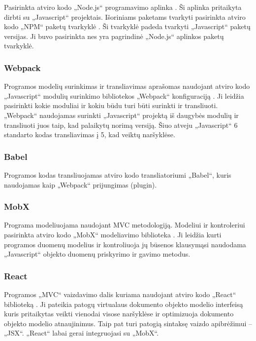 Pasirinkta atviro kodo „Node.js“ programavimo aplinka \cite{nodeJs}. Ši aplinka pritaikyta dirbti su „Javascript“ projektais. Išoriniams paketams tvarkyti pasirinkta atviro kodo „NPM“ paketų tvarkyklė \cite{npmWebsite}. Ši tvarkyklė padeda tvarkyti „Javascript“ paketų versijas. Ji buvo pasirinkta nes yra pagrindinė „Node.js“ aplinkos paketų tvarkyklė.


\subsubsection{Webpack}

Programos modelių surinkimas ir transliavimas aprašomas naudojant atviro kodo „Javascript“ modulių surinkimo bibliotekos „Webpack“ konfiguraciją \cite{webpack}. Ji leidžia pasirinkti kokie moduliai ir kokiu būdu turi būti surinkti ir transliuoti. „Webpack“ naudojamas surinkti „Javascript“ projektą iš daugybės modulių ir transliuoti juos taip, kad palaikytų norimą versiją. Šiuo atveju „Javascript“ 6 standarto kodas transliavimas į 5, kad veiktų naršyklėse.

\subsubsection{Babel}

Programos kodas transliuojamas atviro kodo transliatoriumi „Babel“, kuris naudojamas kaip „Webpack“ prijungimas (plugin).


\subsubsection{MobX}

Programa modeliuojama naudojant MVC metodologiją. Modeliui ir kontroleriui pasirinkta atviro kodo „MobX“ modeliavimo biblioteka \cite{githubMobX}. Ji leidžia kurti programos duomenų modelius ir kontroliuoja jų būsenos klausymąsi naudodama „Javascript“ objekto duomenų priskyrimo ir gavimo metodus.

\subsubsection{React}

Programos „MVC“ vaizdavimo dalis kuriama naudojant atviro kodo „React“ biblioteką \cite{reactJs}. Ji pateikia patogų virtualaus dokumento objekto modelio interfeisą kuris pritaikytas veikti vienodai visose naršyklėse ir optimizuoja dokumento objekto modelio atnaujinimus. Taip pat turi patogią sintaksę vaizdo apibrėžimui – „JSX“. „React“ labai gerai integruojasi su „MobX“.

